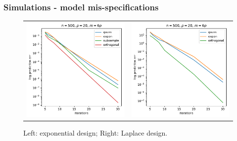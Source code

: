 \documentclass{beamer}
\begin{document}
\begin{frame}
    \frametitle{Simulations - model mis-specifications}

    \begin{figure}
        \begin{center}
            \begin{tabular}{ll}
                \includegraphics[scale=0.32]{exp_design_err_vs_iter_n500_p20_m120.pdf}
                &
                \includegraphics[scale=0.32]{cauchy_design_err_vs_iter_n500_p20_m120.pdf}
            \end{tabular}
            \caption{Left: exponential design; Right: Laplace design.}
        \end{center}
    \end{figure}
\end{frame}
\end{document}
